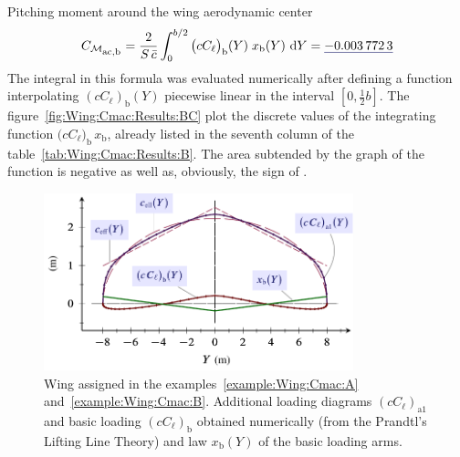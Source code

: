 \documentclass[[12pt,twoside]{book}
\begin{document}
\begin{myExampleX}{Pitching moment around the wing aerodynamic center}{}
\[
C_{\mathcal{M}_\mathlarger{\mathrm{ac,b}}} 
  =
  \frac{2}{S\,\bar{c}} \int_0^{b/2} \big(cC_{\ell}\big)_\mathrm{b}(Y) \; x_\mathrm{b}(Y)\, \diff{Y}
  = 
  \mathunderline{mydarkblue}{ \SI[round-precision=5]{\myCmZeroBWing}{} }
\]
The integral in this formula was evaluated numerically after defining a function
interpolating $(cC_\ell)_\mathrm{b}(Y)$ piecewise linear in the interval
$[0,\frac{1}{2}b]$.
The figure~\ref{fig:Wing:Cmac:Results:BC} plot the discrete values of the
integrating function
$\big(cC_{\ell}\big)_\mathrm{b} \, x_\mathrm{b}$,
already listed in the seventh column of the table~\ref{tab:Wing:Cmac:Results:B}.
The area subtended by the graph of the function is negative as well as, obviously, the sign
of .

\end{myExampleX}
\begin{figure}
  [t]%
    \includegraphics[width=0.80\textwidth]{Chapter_2/pitching_moment_two/wing_Cmac_2_loading_drawing.pdf}%
  \caption{
           Wing assigned in the examples~\ref{example:Wing:Cmac:A} and~\ref{example:Wing:Cmac:B}.
           Additional loading diagrams $(cC_\ell)_\mathrm{a1}$ and basic loading $(cC_\ell)_\mathrm{b}$ obtained numerically
            (from the Prandtl's Lifting Line Theory)
            and law $x_\mathrm{b}(Y)$ of the basic loading arms.}
  \label{fig:Wing:Cmac:Results:BA}%
\end{figure}
\end{document}
